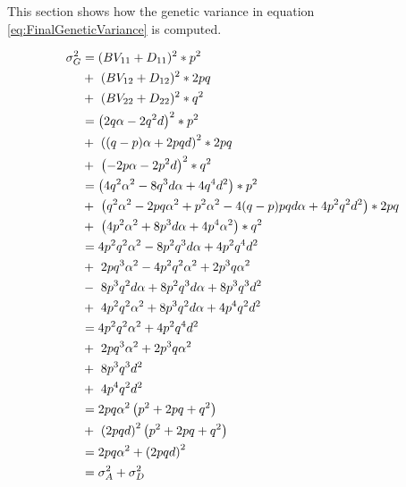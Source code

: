 \documentclass[
]{book}
\theoremstyle{definition}
\theoremstyle{definition}
\theoremstyle{definition}
\theoremstyle{remark}
\begin{document}
This section shows how the genetic variance in equation \eqref{eq:FinalGeneticVariance} is computed.

\begin{align}
\sigma_G^2  &=   (BV_{11} + D_{11})^2 * p^2                                       \notag \\
            &   +\  (BV_{12} + D_{12})^2 * 2pq                                    \notag \\
            &   +\  (BV_{22} + D_{22})^2 * q^2                                    \notag \\
            &=      \left(2q\alpha - 2q^2d   \right)^2 * p^2                      \notag \\
            &   +\  \left((q-p)\alpha + 2pqd \right)^2 * 2pq                      \notag \\
            &   +\  \left(-2p\alpha - 2p^2d  \right)^2 * q^2                      \notag \\
            &=      \left(4q^2\alpha^2 - 8q^3d\alpha + 4q^4d^2  \right) * p^2     \notag \\
            &   +\  \left(q^2\alpha^2 - 2pq\alpha^2 + p^2\alpha^2
                           - 4(q-p)pqd\alpha + 4p^2q^2d^2\right) * 2pq            \notag \\
            &   +\  \left(4p^2\alpha^2 + 8p^3d\alpha + 4p^4\alpha^2 \right) * q^2 \notag \\
            &=      4p^2q^2\alpha^2 - 8p^2q^3d\alpha + 4p^2q^4d^2                 \notag \\
            &   +\  2pq^3\alpha^2 - 4p^2q^2\alpha^2+ 2p^3q\alpha^2                \notag \\
            &   -\  8p^3q^2d\alpha + 8p^2q^3d\alpha + 8p^3q^3d^2                  \notag \\
            &   +\  4p^2q^2\alpha^2 + 8p^3q^2d\alpha + 4p^4q^2d^2                 \notag \\
            &=      4p^2q^2\alpha^2 + 4p^2q^4d^2                                  \notag \\
            &   +\  2pq^3\alpha^2 + 2p^3q\alpha^2                                 \notag \\
            &   +\  8p^3q^3d^2                                                    \notag \\
            &   +\  4p^4q^2d^2                                                    \notag \\
            &=      2pq\alpha^2 \left(p^2 + 2pq + q^2 \right)                     \notag \\
            &   +\  \left(2pqd \right)^2 \left(p^2 + 2pq + q^2 \right)            \notag \\
            &=      2pq\alpha^2 + \left(2pqd \right)^2                            \notag \\
            &=      \sigma_A^2 + \sigma_D^2
\label{eq:GenVarZWD}
\end{align}
\end{document}
